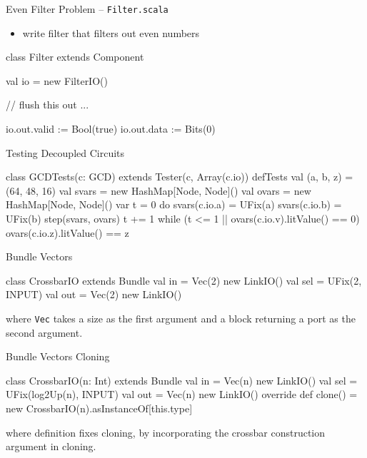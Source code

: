 \documentclass[xcolor=pdflatex,dvipsnames,table]{beamer}
\begin{document}
\begin{frame}[fragile]{Even Filter Problem -- \tt Filter.scala}
\begin{itemize}
\item write filter that filters out even numbers
\end{itemize}
\begin{scala}
class Filter extends Component { 
  val io  = new FilterIO()

  // flush this out ...

  io.out.valid := Bool(true)
  io.out.data  := Bits(0)
}
\end{scala}
\end{frame}

\begin{frame}[fragile]{Testing Decoupled Circuits}

\begin{scala}
class GCDTests(c: GCD) extends Tester(c, Array(c.io)) {
  defTests {
    val (a, b, z) = (64, 48, 16)
    val svars = new HashMap[Node, Node]()
    val ovars = new HashMap[Node, Node]()
    var t = 0
    do {
      svars(c.io.a) = UFix(a)
      svars(c.io.b) = UFix(b)
      step(svars, ovars)
      t += 1
    } while (t <= 1 || ovars(c.io.v).litValue() == 0)
    ovars(c.io.z).litValue() == z
  }
}
\end{scala}

\end{frame}

\begin{frame}[fragile]{Bundle Vectors}

\begin{scala}
class CrossbarIO extends Bundle {
  val in  = Vec(2){ new LinkIO() }
  val sel = UFix(2, INPUT)
  val out = Vec(2){ new LinkIO() }
}
\end{scala}

\noindent
where \verb+Vec+ takes a size as the first argument and a block
returning a port as the second argument.

\end{frame}

\begin{frame}[fragile]{Bundle Vectors Cloning}

\begin{scala}
class CrossbarIO(n: Int) extends Bundle {
  val in  = Vec(n){ new LinkIO() }
  val sel = UFix(log2Up(n), INPUT)
  val out = Vec(n){ new LinkIO() }
  override def clone() = new CrossbarIO(n).asInstanceOf[this.type]
}
\end{scala}

\noindent
where  definition fixes cloning, by incorporating the crossbar construction argument  in cloning.

\end{frame}
\end{document}
